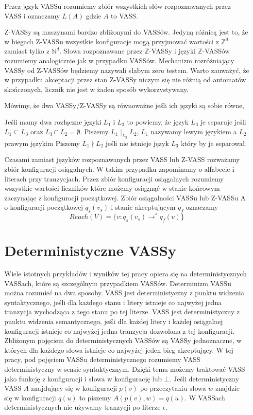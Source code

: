 \documentclass[magisterska]{pracamgr}
\begin{document}
    Przez język VASSu rozumiemy zbiór wszystkich słów rozpoznawanych przez VASS i oznaczamy $L(A)$ gdzie $A$ to VASS.


    Z-VASSy są maszynami bardzo zbliżonymi do VASSów.
    Jedyną różnicą jest to, że w biegach Z-VASSu wszystkie konfiguracje mogą przyjmować wartości z $\mathbb{Z}^d$ zamiast tylko z $\mathbb{N}^d$.
    Słowa rozpoznawane przez $\mathbb{Z}$-VASSy i języki $\mathbb{Z}$-VASSów rozumiemy analogicznie jak w przypadku VASSów.
    Mechanizm rozróżniający VASSy od Z-VASSów będziemy nazywali słabym zero testem.
    Warto zauważyć, że w przypadku akceptacji przez stan Z-VASSy niczym się nie różnią od automatów skończonych, licznik nie jest w żaden sposób wykorzystywany.

    Mówimy, że dwa VASSy/Z-VASSy są równoważne jeśli ich języki są sobie równe,

    Jeśli mamy dwa rozłączne języki $L_1$ i $L_2$ to powiemy, że język $L_3$ je separuje jeśli
    $L_1 \subseteq L_3$ oraz $L_3 \cap L_2 = \emptyset$.
    Piszemy $L_1 \mid_{L_3} L_2$, $L_1$ nazywamy lewym językiem a $L_2$ prawym językim
    Piszemy $L_1 \nmid L_2$ jeśli nie istnieje język $L_3$ który by je separował.

    Czasami zamiast języków rozpoznawanych przez VASS lub Z-VASS rozważamy zbiór konfiguracji osiągalnych.
    W takim przypadku zapominamy o alfabecie i literach przy tranzycjach.
    Przez zbiór konfiguracji osiągalnych rozumiemy wszystkie wartości liczników które możemy osiągnąć w stanie końcowym zaczynając z konfiguracji początkowej.
    Zbiór osiągalności VASSu lub Z-VASSu A o konfiguracji początkowej $q_s(v_s)$ i stanie akceptującym $q_f$ oznaczamy
    \[Reach(V) = \{v:q_s(v_s)\rightarrow^*q_f(v)\}\]


    \section{Deterministyczne VASSy}
    Wiele istotnych przykładów i wyników tej pracy opiera się na deterministycznych VASSach, które są szczególnym przypadkiem VASSów.
    Determinizm VASSu można rozumieć na dwa sposoby.
    VASS jest deterministyczny z punktu widzenia syntaktycznego, jeśli dla każdego stanu i litery istnieje co najwyżej
    jedna tranzycja wychodząca z tego stanu po tej literze.
    VASS jest deterministyczny z punktu widzenia semantycznego, jeśli dla każdej litery i każdej osiągalnej konfiguracji
    istnieje co najwyżej jedna tranzycja dozwolona z tej konfiguracji.
    Zbliżonym pojęciem do deterministycznych VASSów są VASSy jednoznaczne, w których dla każdego słowa istnieje co najwyżej jeden bieg
    akceptujący.
    W tej pracy, pod pojęciem VASSu deterministycznego rozumiemy VASS deterministyczny w sensie syntaktycznym.
    Dzięki temu możemy traktować VASS jako funkcję z konfiguracji i słowa w konfigurację lub $\bot$.
    Jeśli deterministyczny VASS $A$ znajdujący się w konfiguracji $p(v)$ po przeczytaniu słowa $w$  znajdzie się w konfiguracji $q(u)$ to piszemy
    $A(p(v),w) = q(u)$.
    W VASSach deterministycznych nie używamy tranzycji po literze $\epsilon$.
\end{document}
